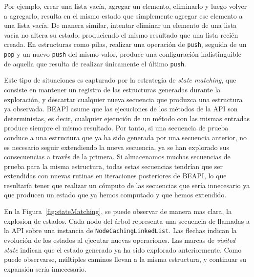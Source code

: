 Por ejemplo, crear una lista vacía, agregar un elemento, eliminarlo y luego volver a agregarlo, resulta en el mismo estado que simplemente agregar ese elemento a una lista vacía. 
De manera similar, intentar eliminar un elemento de una lista vacía no altera su estado, produciendo el mismo resultado que una lista recién creada. 
En estructuras como pilas, realizar una operación de \texttt{push}, seguida de un \texttt{pop} y un nuevo \texttt{push} del mismo valor, 
produce una configuración indistinguible de aquella que resulta de realizar únicamente el último \texttt{push}. 

Este tipo de situaciones es capturado por la estrategia de \emph{state matching}, que consiste en mantener un registro de las estructuras generadas durante la exploración, y descartar cualquier nueva secuencia que produzca una estructura ya observada. 
\textsf{BEAPI} asume que las ejecuciones de los métodos de la API son deterministas, es decir, cualquier ejecución de un método con las mismas entradas produce siempre el mismo resultado. 
Por tanto, si una secuencia de prueba conduce a una estructura que ya ha sido generada por una secuencia anterior, no es necesario seguir extendiendo la nueva secuencia, 
ya se han explorado sus consecuencias a través de la primera.
Si almacenamos muchas secuencias de prueba para la misma estructura, todas estas secuencias tendrían que ser extendidas con nuevas rutinas en iteraciones posteriores de \textsf{BEAPI}, 
lo que resultaría tener que realizar un cómputo de las secuencias que sería innecesario ya que producen un estado que ya hemos computado y que hemos extendido.  

En la Figura~\ref{fig:stateMatching}, se puede observar de manera mas clara, la explosion de estados. 
Cada nodo del árbol representa una secuencia de llamadas a la API sobre una instancia de \texttt{NodeCachingLinkedList}. 
Las flechas indican la evolución de los estados al ejecutar nuevas operaciones. 
Las marcas de \emph{visited state}  indican que el estado generado ya ha sido explorado anteriormente. 
Como puede observarse, múltiples caminos llevan a la misma estructura, y continuar su expansión sería innecesario.

